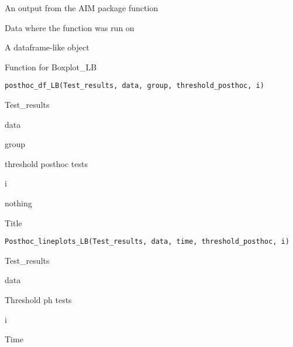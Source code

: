 \documentclass[a4paper]{book}
\begin{document}
%
\begin{Arguments}
\begin{ldescription}
\item[\code{res.index}] An output from the AIM package function

\item[\code{aim.data}] Data where the function was run on
\end{ldescription}
\end{Arguments}
%
\begin{Value}
A dataframe-like object
\end{Value}
%
\begin{Description}
Function for Boxplot\_LB
\end{Description}
%
\begin{Usage}
\begin{verbatim}
posthoc_df_LB(Test_results, data, group, threshold_posthoc, i)
\end{verbatim}
\end{Usage}
%
\begin{Arguments}
\begin{ldescription}
\item[\code{Test\_results}] Test\_results

\item[\code{data}] data

\item[\code{group}] group

\item[\code{threshold\_posthoc}] threshold posthoc tests

\item[\code{i}] i
\end{ldescription}
\end{Arguments}
%
\begin{Value}
nothing
\end{Value}
%
\begin{Description}
Title
\end{Description}
%
\begin{Usage}
\begin{verbatim}
Posthoc_lineplots_LB(Test_results, data, time, threshold_posthoc, i)
\end{verbatim}
\end{Usage}
%
\begin{Arguments}
\begin{ldescription}
\item[\code{Test\_results}] Test\_results

\item[\code{data}] data

\item[\code{threshold\_posthoc}] Threshold ph tests

\item[\code{i}] i

\item[\code{Time}] Time
\end{ldescription}
\end{Arguments}
\end{document}
